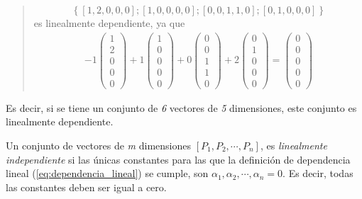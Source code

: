 \begin{quote}
  \[
    \left\{
      \left[1,2,0,0,0\right];
      \left[1,0,0,0,0\right];
      \left[0,0,1,1,0\right];
      \left[0,1,0,0,0\right]
    \right\}
  \]
  es linealmente dependiente, ya que 
  \begin{align*}
    -1\begin{pmatrix}
      1 \\ 2 \\ 0 \\ 0 \\ 0
    \end{pmatrix} + 1 \begin{pmatrix}
      1 \\ 0 \\ 0 \\ 0 \\ 0
    \end{pmatrix} + 0 \begin{pmatrix}
      0 \\ 0 \\ 1 \\ 1 \\ 0
    \end{pmatrix} + 2 \begin{pmatrix}
      0 \\ 1 \\ 0 \\ 0 \\ 0
    \end{pmatrix} = \begin{pmatrix}
      0 \\ 0 \\ 0 \\ 0 \\ 0
    \end{pmatrix}
  \end{align*}
\end{quote}


\noindent Es decir, si se tiene un conjunto de \textit{6} vectores de \textit{5} dimensiones, este conjunto es linealmente dependiente.

\vspace{5mm}

Un conjunto de vectores de \textit{m} dimensiones \(\left[P_1, P_2, \cdots, P_n\right]\), es \textit{linealmente independiente} si las únicas constantes para las que la definición de dependencia lineal (\ref{eq:dependencia_lineal}) se cumple, son \(\alpha_1, \alpha_2, \cdots, \alpha_n = 0\). Es decir, todas las constantes deben ser igual a cero.

